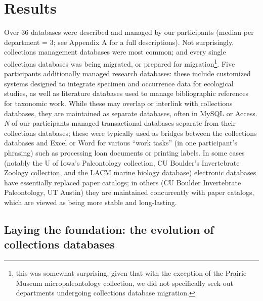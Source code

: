 \section{Results}

Over 36 databases were described and managed by our participants (median per department = 3; see Appendix A for a full descriptions). Not surprisingly, collections management databases were most common; and every single collections databases was being migrated, or prepared for migration\footnote{this was somewhat surprising, given that with the exception of the Prairie Museum micropaleontology collection, we did not specifically seek out departments undergoing collections database migration.}. Five participants additionally managed research databases: these include customized systems designed to integrate specimen and occurrence data for ecological studies, as well as literature databases used to manage bibliographic references for taxonomic work. While these may overlap or interlink with collections databases, they are maintained as separate databases, often in MySQL or Access. \textit{N} of our participants managed transactional databases separate from their collections databases; these were typically used as bridges between the collections databases and Excel or Word for various “work tasks” (in one participant’s phrasing) such as processing loan documents or printing labels. In some cases (notably the U of Iowa’s Paleontology collection, CU Boulder’s Invertebrate Zoology collection, and the LACM marine biology database) electronic databases have essentially replaced paper catalogs; in others (CU Boulder Invertebrate Paleontology, UT Austin) they are maintained concurrently with paper catalogs, which are viewed as being more stable and long-lasting.

\subsection{Laying the foundation: the evolution of collections databases}

